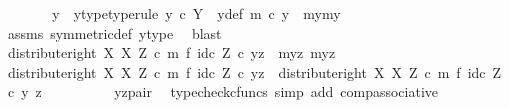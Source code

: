 \begin{isabellebody}
\ \ \ \ \isamarkupfalse%
\ \isamarkupfalse%
\ y{\isacharprime}{\kern0pt}\ \ y{\isacharprime}{\kern0pt}{\isacharunderscore}{\kern0pt}type{\isacharbrackleft}{\kern0pt}type{\isacharunderscore}{\kern0pt}rule{\isacharbrackright}{\kern0pt}{\isacharcolon}{\kern0pt}\ {\isachardoublequoteopen}y{\isacharprime}{\kern0pt}\ {\isasymin}\isactrlsub c\ Y{\isachardoublequoteclose}\ \ y{\isacharprime}{\kern0pt}{\isacharunderscore}{\kern0pt}def{\isacharcolon}{\kern0pt}\ {\isachardoublequoteopen}m\ {\isasymcirc}\isactrlsub c\ y{\isacharprime}{\kern0pt}\ {\isacharequal}{\kern0pt}\ {\isasymlangle}my{}{\isacharcomma}{\kern0pt}my{}{\isasymrangle}{\isachardoublequoteclose}\isanewline
\ \ \ \ \ \ \isamarkupfalse%
\ assms\ symmetric{\isacharunderscore}{\kern0pt}def{}\ y{\isacharunderscore}{\kern0pt}type\ \isamarkupfalse%
\ blast\isanewline
\isanewline
\ \ \ \ \isamarkupfalse%
\ {\isachardoublequoteopen}{\isacharparenleft}{\kern0pt}distribute{\isacharunderscore}{\kern0pt}right\ X\ X\ Z\ {\isasymcirc}\isactrlsub c\ {\isacharparenleft}{\kern0pt}m\ {\isasymtimes}\isactrlsub f\ id\isactrlsub c\ Z{\isacharparenright}{\kern0pt}{\isacharparenright}{\kern0pt}\ {\isasymcirc}\isactrlsub c\ yz\ {\isacharequal}{\kern0pt}\ {\isasymlangle}{\isasymlangle}my{}{\isacharcomma}{\kern0pt}z{\isasymrangle}{\isacharcomma}{\kern0pt}\ {\isasymlangle}my{}{\isacharcomma}{\kern0pt}z{\isasymrangle}{\isasymrangle}{\isachardoublequoteclose}\isanewline
\ \ \ \ \isamarkupfalse%
\ {\isacharminus}{\kern0pt}\isanewline
\ \ \ \ \ \ \isamarkupfalse%
\ {\isachardoublequoteopen}{\isacharparenleft}{\kern0pt}distribute{\isacharunderscore}{\kern0pt}right\ X\ X\ Z\ {\isasymcirc}\isactrlsub c\ {\isacharparenleft}{\kern0pt}m\ {\isasymtimes}\isactrlsub f\ id\isactrlsub c\ Z{\isacharparenright}{\kern0pt}{\isacharparenright}{\kern0pt}\ {\isasymcirc}\isactrlsub c\ yz\ {\isacharequal}{\kern0pt}\ distribute{\isacharunderscore}{\kern0pt}right\ X\ X\ Z\ {\isasymcirc}\isactrlsub c\ {\isacharparenleft}{\kern0pt}m\ {\isasymtimes}\isactrlsub f\ id\isactrlsub c\ Z{\isacharparenright}{\kern0pt}\ {\isasymcirc}\isactrlsub c\ {\isasymlangle}y{\isacharcomma}{\kern0pt}\ z{\isasymrangle}{\isachardoublequoteclose}\isanewline
\ \ \ \ \ \ \ \ \isamarkupfalse%
\ yz{\isacharunderscore}{\kern0pt}pair\ \isamarkupfalse%
\ {\isacharparenleft}{\kern0pt}typecheck{\isacharunderscore}{\kern0pt}cfuncs{\isacharcomma}{\kern0pt}\ simp\ add{\isacharcolon}{\kern0pt}\ comp{\isacharunderscore}{\kern0pt}associative{}{\isacharparenright}{\kern0pt}\isanewline

\end{isabellebody}
